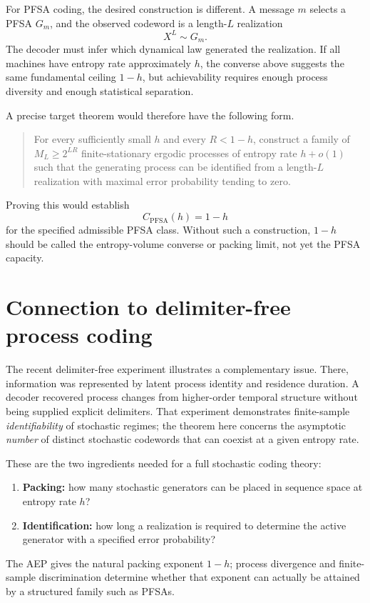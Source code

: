 \documentclass[11pt]{article}
\begin{document}
For PFSA coding, the desired construction is different.  A message $m$ selects a PFSA $G_m$, and the observed codeword is a length-$L$ realization
\[
X^L\sim G_m.
\]
The decoder must infer which dynamical law generated the realization.  If all machines have entropy rate approximately $h$, the converse above suggests the same fundamental ceiling $1-h$, but achievability requires enough process diversity and enough statistical separation.

A precise target theorem would therefore have the following form.

\begin{quote}
For every sufficiently small $h$ and every $R<1-h$, construct a family of $M_L\ge2^{LR}$ finite-stationary ergodic processes of entropy rate $h+o(1)$ such that the generating process can be identified from a length-$L$ realization with maximal error probability tending to zero.
\end{quote}

Proving this would establish
\[
C_{\mathrm{PFSA}}(h)=1-h
\]
for the specified admissible PFSA class.  Without such a construction, $1-h$ should be called the entropy-volume converse or packing limit, not yet the PFSA capacity.

\section{Connection to delimiter-free process coding}
The recent delimiter-free experiment illustrates a complementary issue.  There, information was represented by latent process identity and residence duration.  A decoder recovered process changes from higher-order temporal structure without being supplied explicit delimiters.  That experiment demonstrates finite-sample \emph{identifiability} of stochastic regimes; the theorem here concerns the asymptotic \emph{number} of distinct stochastic codewords that can coexist at a given entropy rate.

These are the two ingredients needed for a full stochastic coding theory:
\begin{enumerate}[leftmargin=2em]
\item \textbf{Packing:} how many stochastic generators can be placed in sequence space at entropy rate $h$?
\item \textbf{Identification:} how long a realization is required to determine the active generator with a specified error probability?
\end{enumerate}
The AEP gives the natural packing exponent $1-h$; process divergence and finite-sample discrimination determine whether that exponent can actually be attained by a structured family such as PFSAs.
\end{document}
